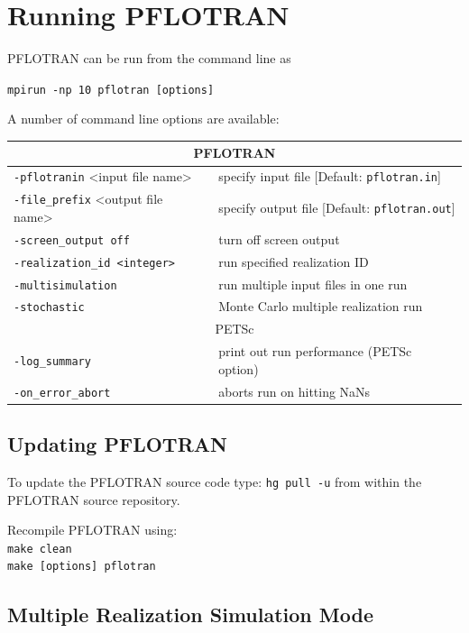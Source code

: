 \documentclass[12pt]{article}
\begin{document}
\normalsize

\section{Running PFLOTRAN}

PFLOTRAN can be run from the command line as

\verb|mpirun -np 10 pflotran [options]|

A number of command line options are available:

\begin{tabular}{ll}
\toprule
\multicolumn{2}{c}{PFLOTRAN}\\
\midrule
{\tt -pflotranin} <input file name> & specify input file [Default: {\tt pflotran.in}]\\
{\tt -file\_prefix} <output file name> & specify output file [Default: {\tt pflotran.out}]\\
{\tt -screen\_output off} & turn off screen output\\
{\tt -realization\_id <integer>} & run specified realization ID\\
{\tt -multisimulation} & run multiple input files in one run\\
{\tt -stochastic} & Monte Carlo multiple realization run\\
\midrule
\multicolumn{2}{c}{PETSc}\\
\midrule
{\tt -log\_summary} & print out run performance (PETSc option)\\
{\tt -on\_error\_abort} & aborts run on hitting NaNs\\
\bottomrule
\end{tabular}

\subsection*{Updating PFLOTRAN}

To update the PFLOTRAN source code
type: {\tt hg pull -u} from within the PFLOTRAN source repository.

\noindent
Recompile PFLOTRAN using:\\
\indent
{\tt make clean}\\
\indent
{\tt make [options] pflotran}

\subsection*{Multiple Realization Simulation Mode}
\end{document}
